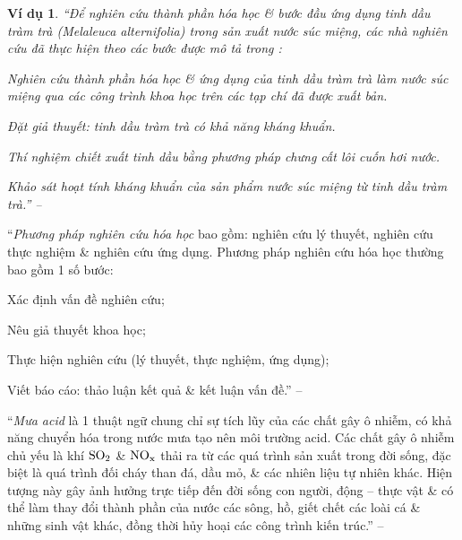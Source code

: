 \documentclass[oneside]{book}
\numberwithin{equation}{section}
\newtheorem{vidu}{Ví dụ}[section]
\begin{document}
\begin{vidu}
	``Để nghiên cứu thành phần hóa học \& bước đầu ứng dụng tinh dầu tràm trà (\emph{Melaleuca alternifolia}) trong sản xuất nước súc miệng, các nhà nghiên cứu đã thực hiện theo các bước được mô tả trong  \cite[Hình 1.12: \textsf{Các bước thực hiện trong đề tài nghiên cứu thành phần hóa học \& bước đầu ứng dụng tinh dầu tràm trà trong sản xuất nước súc miệng}, p. 10]{SGK_Hoa_Hoc_10_Chan_Troi_Sang_Tao}:
	\begin{enumerate*}
		\item[\textbf{1.}] Nghiên cứu thành phần hóa học \& ứng dụng của tinh dầu tràm trà làm nước súc miệng qua các công trình khoa học trên các tạp chí đã được xuất bản.
		\item[\textbf{2.}] Đặt giả thuyết: tinh dầu tràm trà có khả năng kháng khuẩn.
		\item[\textbf{3.}] Thí nghiệm chiết xuất tinh dầu bằng phương pháp chưng cất lôi cuốn hơi nước.
		\item[\textbf{4.}] Khảo sát hoạt tính kháng khuẩn của sản phẩm nước súc miệng từ tinh dầu tràm trà.'' -- \cite[p. 10]{SGK_Hoa_Hoc_10_Chan_Troi_Sang_Tao}
	\end{enumerate*}
\end{vidu}
``\textit{Phương pháp nghiên cứu hóa học} bao gồm: nghiên cứu lý thuyết, nghiên cứu thực nghiệm \& nghiên cứu ứng dụng. Phương pháp nghiên cứu hóa học thường bao gồm 1 số bước:
\begin{enumerate*}
	\item[\textbf{1.}] Xác định vấn đề nghiên cứu;
	\item[\textbf{2.}] Nêu giả thuyết khoa học;
	\item[\textbf{3.}] Thực hiện nghiên cứu (lý thuyết, thực nghiệm, ứng dụng);
	\item[\textbf{4.}] Viết báo cáo: thảo luận kết quả \& kết luận vấn đề.'' -- \cite[p. 11]{SGK_Hoa_Hoc_10_Chan_Troi_Sang_Tao}
\end{enumerate*}
``\textit{Mưa acid} là 1 thuật ngữ chung chỉ sự tích lũy của các chất gây ô nhiễm, có khả năng chuyển hóa trong nước mưa tạo nên môi trường acid. Các chất gây ô nhiễm chủ yếu là khí $\rm SO_2$ \& $\rm NO_x$ thải ra từ các quá trình sản xuất trong đời sống, đặc biệt là quá trình đối cháy than đá, dầu mỏ, \& các nhiên liệu tự nhiên khác. Hiện tượng này gây ảnh hưởng trực tiếp đến đời sống con người, động -- thực vật \& có thể làm thay đổi thành phần của nước các sông, hồ, giết chết các loài cá \& những sinh vật khác, đồng thời hủy hoại các công trình kiến trúc.'' -- \cite[p. 11]{SGK_Hoa_Hoc_10_Chan_Troi_Sang_Tao}
\end{document}
